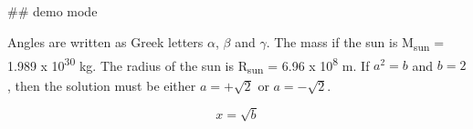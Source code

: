 \documentclass[11pt]{article}
\date{\today}
\title{}
\begin{document}
\tableofcontents

\#\# demo mode

Angles are written as Greek letters \(\alpha\), \(\beta\) and \(\gamma\).  The mass if
the sun is M\textsubscript{sun} = 1.989 x 10\textsuperscript{30} kg.  The radius of the sun is R\textsubscript{sun} =
6.96 x 10\textsuperscript{8} m.  If \(a^2=b\) and \(b=2\), then the solution must be either
\(a=+\sqrt{2}\) or \(a=-\sqrt{2}\).

\begin{equation}
x=\sqrt{b}
\end{equation}
\end{document}
